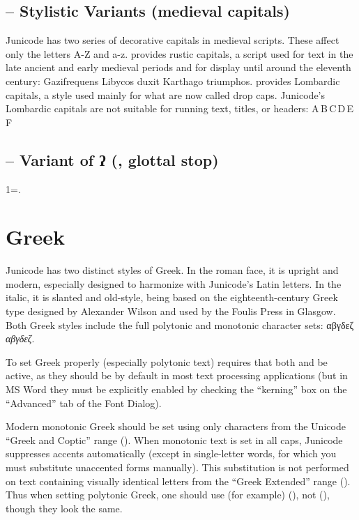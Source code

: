 \subsection{ --
Stylistic Variants (medieval capitals)}\hypertarget{salt}{}
Junicode has two series of decorative capitals in medieval scripts. These affect only the letters
A-Z and a-z.  provides rustic capitals, a script used for text in the late
ancient and early medieval periods and for display until around the eleventh century:
{Gazifrequens Libycos duxit Karthago triumphos}. 
provides Lombardic capitals, a style used mainly for what are now called drop caps. Junicode’s Lombardic capitals
are not suitable for running text, titles, or headers:
{A\,B\,C\,D\,E\,F}

\subsection{ -- Variant of ʔ (, glottal stop)}
1=.

\section{Greek}
Junicode has two distinct styles of Greek. In the roman face, it is upright and
modern, especially designed to harmonize with Junicode's Latin letters. In the
italic, it is slanted and old-style, being based on the eighteenth-century
Greek type designed by Alexander Wilson and used by the Foulis Press in
Glasgow. Both Greek styles include the full polytonic and monotonic character
sets: αβγδεζ \textit{αβγδεζ}.

To set Greek properly (especially polytonic text) requires that both 
and  be active, as they should be by default in most
text processing applications (but in MS Word they must be explicitly enabled
by checking the ``kerning'' box on the ``Advanced'' tab of the Font Dialog).

Modern monotonic Greek should be set using only characters from the Unicode “Greek
and Coptic” range (). When monotonic text is set in all caps, Junicode
suppresses accents automatically (except in single-letter words, for which
you must substitute unaccented forms manually). This substitution is not
performed on text containing visually identical letters from the ``Greek Extended''
range ().
Thus when setting polytonic Greek, one should use (for example) 
(), not  (),
though they look the same.

